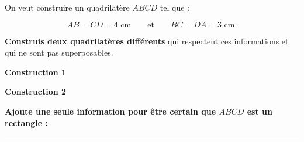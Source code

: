 \documentclass[10pt,a4paper]{article}
\newcommand{\grandeactivite}[2]{%
\begin{tcolorbox}[
  enhanced,
  colback=white,
  colframe=NeutreC!55,
  boxrule=0.6pt,
  arc=1.5mm,
  left=4mm,
  right=4mm,
  top=2.5mm,
  bottom=2.5mm,
  title={\sffamily\bfseries\color{TitreC}#1},
  coltitle=TitreC,
  colbacktitle=NeutreBg
]
#2
\end{tcolorbox}
}
\begin{document}
\grandeactivite{Deux figures possibles}{

On veut construire un quadrilatère \(ABCD\) tel que :

\[
AB=CD=4\text{ cm}
\qquad\text{et}\qquad
BC=DA=3\text{ cm}.
\]

\vspace{0.15cm}

\textbf{Construis deux quadrilatères différents}
qui respectent ces informations
et qui ne sont pas superposables.

\vspace{0.25cm}

\begin{minipage}[t]{0.48\linewidth}

\begin{center}
\textbf{Construction 1}
\end{center}

\begin{tcolorbox}[
  colback=white,
  colframe=NeutreC!30,
  boxrule=0.4pt,
  height=7.5cm
]
\end{tcolorbox}

\end{minipage}
\hfill
\begin{minipage}[t]{0.48\linewidth}

\begin{center}
\textbf{Construction 2}
\end{center}

\begin{tcolorbox}[
  colback=white,
  colframe=NeutreC!30,
  boxrule=0.4pt,
  height=7.5cm
]
\end{tcolorbox}

\end{minipage}

\vspace{0.35cm}

\textbf{Ajoute une seule information pour être certain que \(ABCD\) est un rectangle :}

\vspace{0.25cm}

\rule{15cm}{0.4pt}

%
%
%
%
%
%
%
}
\end{document}
